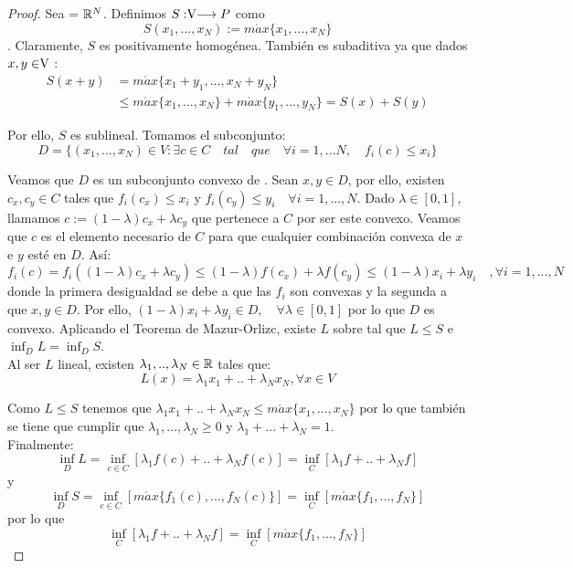 	\begin{proof}
		Sea  \vecSpace = $ \mathbb{R}^N $. Definimos $S:\vecSpace \longrightarrow P $ como \[ S(x_1, ..., x_N) := m\acute{a}x \{x_1, ..., x_N\} \]. Claramente, $ S $ es positivamente homogénea. También es subaditiva ya que dados $ x,y \in \vecSpace $ : 
		\begin{equation*}
		\begin{split}
		S(x+y) &= m\acute{a}x \{x_1 + y_1, ..., x_N +y_N \}\\ 
		&\leq m\acute{a}x \{x_1, ..., x_N\} + m\acute{a}x \{y_1, ...,y_N\} = S(x) + S(y)
		\end{split}
		\end{equation*}
		
		Por ello, $ S $ es sublineal. Tomamos el subconjunto:
		\[ 
		D = \{ (x_1, ..., x_N)\in V: \exists c \in C \quad tal \quad que \quad \forall i = 1,...N,\quad f_i(c) \leq x_i \}
		\]
		
		Veamos que $ D $ es un subconjunto convexo de \vecSpace. Sean $ x, y \in D $, por ello, existen $ c_x, c_y \in C $ tales que $ f_i (c_x) \leq x_i  $ y $ f_i (c_y) \leq y_i \quad \forall i=1,...,N $. Dado $ \lambda \in [0,1] $, llamamos $ c := (1-\lambda)c_x + \lambda c_y $ que pertenece a $ C $ por ser este convexo. Veamos que $ c $ es el elemento necesario de $ C $ para que cualquier combinación convexa de $ x $ e $ y $ esté en $ D $. Así:	
		\[
		f_i(c) = f_i((1-\lambda)c_x + \lambda c_y) \leq (1-\lambda)f(c_x) + \lambda f(c_y) \leq (1-\lambda)x_i + \lambda y_i \quad , \forall i =1,...,N 
		\]
		donde la primera desigualdad se debe a que las $ f_i $ son convexas y la segunda a que $ x,y \in D $. Por ello, $ (1-\lambda)x_i + \lambda y_i \in D , \quad \forall \lambda \in [0,1] $ por lo que $ D $ es convexo. Aplicando el Teorema de Mazur-Orlizc, existe $ L $ sobre \vecSpace tal que $ L \leq S $ e $ \inf_D L = \inf_D S $. \\
		
		Al ser $ L $ lineal, existen $ \lambda_1, .., \lambda_N \in \mathbb{R}$ tales que: 
		\[
		L(x) =  \lambda_1 x_1 + ..+ \lambda_N x_N , \forall x \in V \] 
		
		Como $ L \leq S $ tenemos que $ \lambda_1 x_1 + ..+ \lambda_N x_N \leq m\acute{a}x \{x_1, ..., x_N\} $
		por lo que también se tiene que cumplir que $ \lambda_1, ..., \lambda_N \geq 0$ y $ \lambda_1+ ...+ \lambda_N = 1$. \\
		
		Finalmente:
		\[
		\inf_D L = \inf_{c\in C} \left[ \lambda_1 f(c) + ..+ \lambda_N f(c) \right] = \inf_{C} \left[ \lambda_1 f + ..+ \lambda_N f \right]
		\]
		y
		\[
		\inf_D S = \inf_{c\in C} \left[ m\acute{a}x \{f_1(c), ..., f_N(c)\} \right] = \inf_C\left[ m\acute{a}x \{f_1, ..., f_N\}\right] 
		\]
		por lo que 
		\[ \inf_{C} \left[ \lambda_1 f + ..+ \lambda_N f \right] = \inf_C\left[ m\acute{a}x \{f_1, ..., f_N\}\right]  \] 
	\end{proof}

